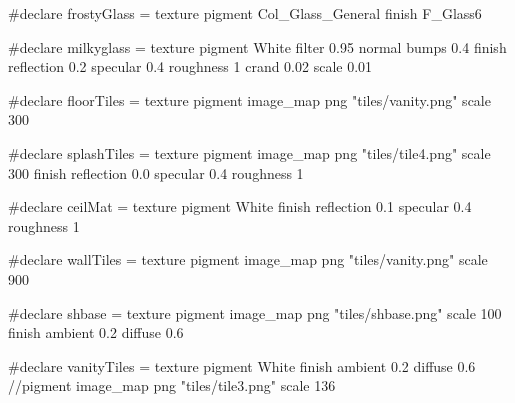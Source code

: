 #declare frostyGlass = texture {
  pigment {Col_Glass_General}
  finish {F_Glass6}
}

#declare milkyglass = texture { pigment {White filter 0.95}
             normal {bumps 0.4}
             finish {reflection 0.2 specular 0.4
                    roughness 1 crand 0.02}
            scale 0.01
}

#declare floorTiles  =  texture { 
  pigment { image_map {png "tiles/vanity.png"} scale 300 }
}

#declare splashTiles  =  texture { 
  pigment { image_map {png "tiles/tile4.png"} scale 300 }
  finish {reflection 0.0 specular 0.4 roughness 1}
}

#declare ceilMat  =  texture { 
  pigment { White }  
  finish {reflection 0.1 specular 0.4 roughness 1}
}

#declare wallTiles = texture {
  pigment { image_map {png "tiles/vanity.png"} scale 900 }
}

#declare shbase = texture {
  pigment { image_map { png "tiles/shbase.png"} scale 100 }
  finish {ambient 0.2  diffuse 0.6}
}

#declare vanityTiles  =  texture { 
  pigment { White }
  finish {ambient 0.2  diffuse 0.6}
  //pigment { image_map {png "tiles/tile3.png"} scale 136 }
}
